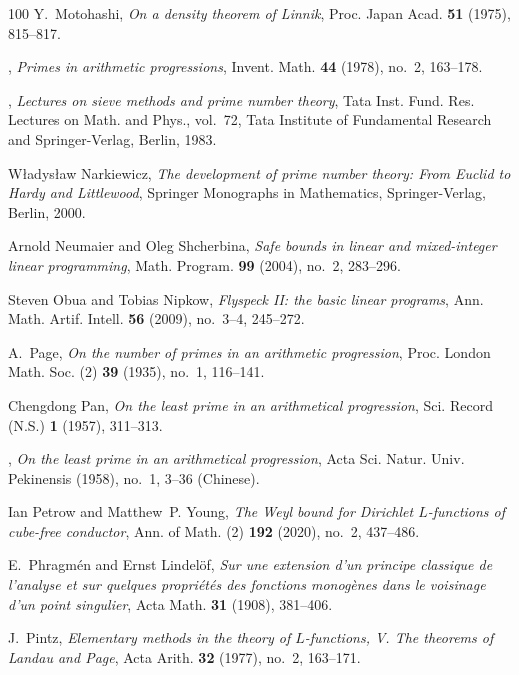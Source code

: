 \documentclass[11pt]{amsart}
\numberwithin{equation}{section}
\theoremstyle{plain}
\theoremstyle{definition}
\theoremstyle{remark}
\newcommand{\1}{\mathbf{1}}
\begin{document}
\begin{thebibliography}{100}
Y.~Motohashi, \emph{On a density theorem of {L}innik}, Proc. Japan Acad.
  \textbf{51} (1975), 815--817.

\bysame, \emph{Primes in arithmetic progressions}, Invent. Math. \textbf{44}
  (1978), no.~2, 163--178.

\bysame, \emph{Lectures on sieve methods and prime number theory}, Tata Inst.
  Fund. Res. Lectures on Math. and Phys., vol.~72, Tata Institute of
  Fundamental Research and Springer-Verlag, Berlin, 1983.

W{\l}adys{\l}aw Narkiewicz, \emph{The development of prime number theory: From
  {E}uclid to {H}ardy and {L}ittlewood}, Springer Monographs in Mathematics,
  Springer-Verlag, Berlin, 2000.

Arnold Neumaier and Oleg Shcherbina, \emph{Safe bounds in linear and
  mixed-integer linear programming}, Math. Program. \textbf{99} (2004), no.~2,
  283--296.

Steven Obua and Tobias Nipkow, \emph{Flyspeck {II}: the basic linear programs},
  Ann. Math. Artif. Intell. \textbf{56} (2009), no.~3--4, 245--272.

A.~Page, \emph{On the number of primes in an arithmetic progression}, Proc.
  London Math. Soc. (2) \textbf{39} (1935), no.~1, 116--141.

Chengdong Pan, \emph{On the least prime in an arithmetical progression}, Sci.
  Record (N.S.) \textbf{1} (1957), 311--313. 

\bysame, \emph{On the least prime in an arithmetical progression}, Acta Sci.
  Natur. Univ. Pekinensis (1958), no.~1, 3--36 (Chinese).

Ian Petrow and Matthew~P. Young, \emph{The {W}eyl bound for {D}irichlet
  {$L$}-functions of cube-free conductor}, Ann. of Math. (2) \textbf{192}
  (2020), no.~2, 437--486.

E.~Phragm{\'e}n and Ernst Lindel{\"o}f, \emph{Sur une extension d'un principe
  classique de l'analyse et sur quelques propri{\'e}t{\'e}s des fonctions
  monog{\`e}nes dans le voisinage d'un point singulier}, Acta Math. \textbf{31}
  (1908), 381--406.

J.~Pintz, \emph{Elementary methods in the theory of {$L$}-functions, {V}. {T}he
  theorems of {L}andau and {P}age}, Acta Arith. \textbf{32} (1977), no.~2,
  163--171.


\end{thebibliography}
\end{document}
